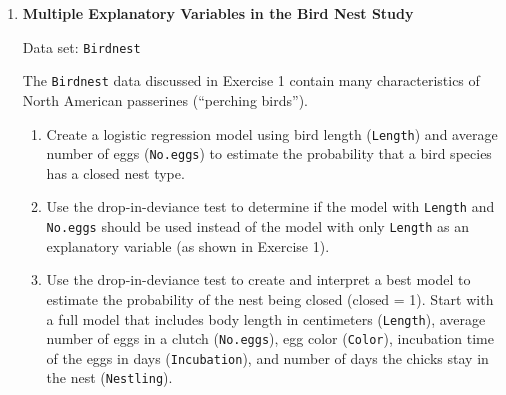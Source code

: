 \documentclass[
]{book}
\begin{document}
\begin{enumerate}
  \begin{enumerate}
    \item Create a logistic regression model using area to estimate the probability of survival.
    \item Calculate the observed and expected probabilities. Plot both of these probabilities against the median area.
    \item Interpret the model in terms of the odds ratio. Use the Wald statistic to create a 95\% confidence interval for the odds ratio.
    \item Test $H_0$: $\beta_1 = 0$ versus $H_a$: $\beta_1 \ne 0$ using both Wald’s test and the likelihood ratio test. State your conclusion based on these tests.
    \item Conduct the Pearson, deviance, and Hosmer-Lemeshow goodness-of-fit tests to assess how well the model fits the data. Interpret the results.
    \item Report and interpret Somers’ $D$, Goodman-Kruskal gamma, or Kendall’s tau-a for this logistic regression model.
    \item What conclusions can you draw from this study?
  \end{enumerate}

  \item \textbf{Multiple Explanatory Variables in the Bird Nest Study}

Data set: \texttt{Birdnest}

The \texttt{Birdnest} data discussed in Exercise 1 contain many characteristics of North American passerines (“perching birds”).

  \begin{enumerate}
    \item Create a logistic regression model using bird length (\texttt{Length}) and average number of eggs (\texttt{No.eggs}) to estimate the probability that a bird species has a closed nest type.
    \item Use the drop-in-deviance test to determine if the model with \texttt{Length} and \texttt{No.eggs} should be used instead of the model with only \texttt{Length} as an explanatory variable (as shown in Exercise 1).
    \item Use the drop-in-deviance test to create and interpret a best model to estimate the probability of the nest being closed (closed = 1). Start with a full model that includes body length in centimeters (\texttt{Length}), average number of eggs in a clutch (\texttt{No.eggs}), egg color (\texttt{Color}), incubation time of the eggs in days (\texttt{Incubation}), and number of days the chicks stay in the nest (\texttt{Nestling}).
  \end{enumerate}


\end{enumerate}
\end{document}
